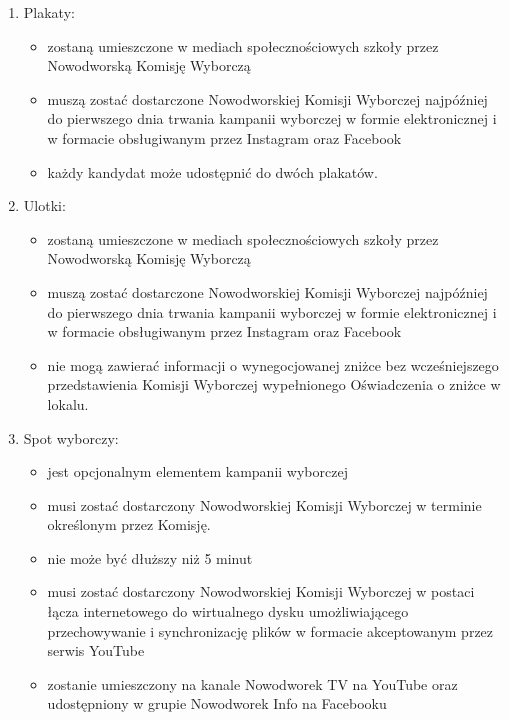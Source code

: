 \documentclass[12pt]{article}
\begin{document}
    \begin{enumerate}
        \item Plakaty:
            \begin{itemize}
                \item zostaną umieszczone w mediach społecznościowych szkoły przez Nowodworską Komisję Wyborczą
                \item muszą zostać dostarczone Nowodworskiej Komisji Wyborczej najpóźniej do pierwszego dnia trwania kampanii wyborczej w formie elektronicznej i w formacie obsługiwanym przez Instagram oraz Facebook
                \item każdy kandydat może udostępnić do dwóch plakatów.
            \end{itemize}
        \item Ulotki:
            \begin{itemize}
                \item zostaną umieszczone w mediach społecznościowych szkoły przez Nowodworską Komisję Wyborczą
                \item muszą zostać dostarczone Nowodworskiej Komisji Wyborczej najpóźniej do pierwszego dnia trwania kampanii wyborczej w formie elektronicznej i w formacie obsługiwanym przez Instagram oraz Facebook
                \item nie mogą zawierać informacji o wynegocjowanej zniżce bez wcześniejszego przedstawienia Komisji Wyborczej wypełnionego Oświadczenia o zniżce w lokalu. 
            \end{itemize}
        \item Spot wyborczy:
            \begin{itemize}
                \item jest opcjonalnym elementem kampanii wyborczej
    
                \item musi zostać dostarczony  Nowodworskiej Komisji Wyborczej w terminie określonym przez Komisję.
    
                \item nie może być dłuższy niż 5 minut
    
                \item musi zostać dostarczony  Nowodworskiej Komisji Wyborczej w postaci łącza internetowego do wirtualnego dysku umożliwiającego przechowywanie i synchronizację plików w formacie akceptowanym przez serwis YouTube
                
                \item zostanie umieszczony na kanale Nowodworek TV na YouTube oraz udostępniony w grupie Nowodworek Info na Facebooku
            \end{itemize}
    

\end{enumerate}
\end{document}
